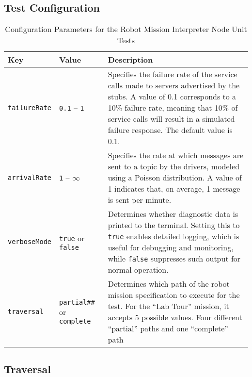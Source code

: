\documentclass{CSSRforAfrica}
\begin{document}
\subsection{Test Configuration}
\begin{longtable}[c]{|l|l|p{8cm}|}
    \caption{Configuration Parameters for the Robot Mission Interpreter Node Unit Tests} \label{tab:config_file}\\
    \hline
    \rowcolor{gray!30}
    \small{\textnormal{Key}} & \small{\textnormal{Value}} & \small{\textnormal{Description}} \\ \hline
    \endfirsthead
    
    \small{\texttt{\small failureRate}} & \small{\texttt{\small 0.1}} -- \texttt{\small 1} & \small{Specifies the failure rate of the service calls made to servers advertised by the stubs. A value of 0.1 corresponds to a 10\% failure rate, meaning that 10\% of service calls will result in a simulated failure response. The default value is 0.1.} \\ \hline
    
    \small{\texttt{\small arrivalRate}} & \small{\texttt{\small 1}} -- \texttt{\small $\infty$} & \small{Specifies the rate at which messages are sent to a topic by the drivers, modeled using a Poisson distribution. A value of 1 indicates that, on average, 1 message is sent per minute.} \\ \hline
    
    \small{\texttt{\small verboseMode}} & \small{\texttt{\small true} or \texttt{\small false}} & \small{Determines whether diagnostic data is printed to the terminal. Setting this to \texttt{\small true} enables detailed logging, which is useful for debugging and monitoring, while \texttt{\small false} suppresses such output for normal operation.} \\ \hline

    \small{\texttt{\small traversal}} & \small{\texttt{\small partial\#\#} or \texttt{\small complete}} & \small{Determines which path of the robot mission specification to execute for the test. For the ``Lab Tour'' mission, it accepts 5 possible values. Four different ``partial'' paths and one ``complete'' path } \\ \hline
    
    \end{longtable}

\subsection{Traversal}
\end{document}
